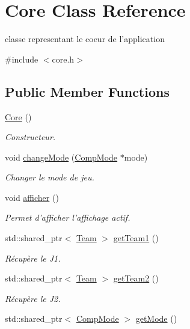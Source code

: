 \hypertarget{classCore}{\section{Core Class Reference}
\label{classCore}
}


classe representant le coeur de l'application  




{\ttfamily \#include $<$core.\+h$>$}

\subsection*{Public Member Functions}
\begin{DoxyCompactItemize}
\item 
\hyperlink{classCore_a14e63188e0aa7c4a6f72d5501384d1f9}{Core} ()
\begin{DoxyCompactList}\small\item\em Constructeur. \end{DoxyCompactList}\item 
void \hyperlink{classCore_aefcf76351ec813fb99f39fbcce42afac}{change\+Mode} (\hyperlink{classCompMode}{Comp\+Mode} $\ast$mode)
\begin{DoxyCompactList}\small\item\em Changer le mode de jeu. \end{DoxyCompactList}\item 
void \hyperlink{classCore_aeb0646c87941a9120d85bbe3f5fb8700}{afficher} ()
\begin{DoxyCompactList}\small\item\em Permet d'afficher l'affichage actif. \end{DoxyCompactList}\item 
std\+::shared\+\_\+ptr$<$ \hyperlink{classTeam}{Team} $>$ \hyperlink{classCore_ab8696ef45b3d2d52ffbbe8a591dc99fb}{get\+Team1} ()
\begin{DoxyCompactList}\small\item\em Récupère le J1. \end{DoxyCompactList}\item 
std\+::shared\+\_\+ptr$<$ \hyperlink{classTeam}{Team} $>$ \hyperlink{classCore_ae2a1b22acb1cc7a021c279b22e5c1cc1}{get\+Team2} ()
\begin{DoxyCompactList}\small\item\em Récupère le J2. \end{DoxyCompactList}\item 
std\+::shared\+\_\+ptr$<$ \hyperlink{classCompMode}{Comp\+Mode} $>$ \hyperlink{classCore_ae18939eeb844be8ec6960af11ddc31db}{get\+Mode} ()

\end{DoxyCompactItemize}
